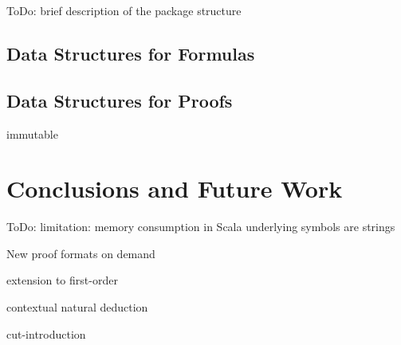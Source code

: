 \documentclass{llncs}
\begin{document}
ToDo: brief description of the package structure


\subsection{Data Structures for Formulas}


\subsection{Data Structures for Proofs}

immutable


\section{Conclusions and Future Work}

ToDo: limitation: memory consumption in Scala
underlying symbols are strings

New proof formats on demand

extension to first-order

contextual natural deduction

cut-introduction



\end{document}
